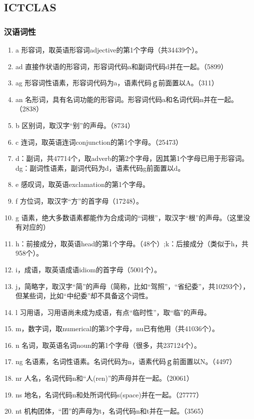 \subsection{ICTCLAS}
\subsubsection{汉语词性}
\begin{enumerate}[(1)]
\item a 形容词，取英语形容词adjective的第1个字母（共34439个）。
\item ad 直接作状语的形容词，形容词代码a和副词代码d并在一起。（5899）
\item ag 形容词性语素，形容词代码为a，语素代码ｇ前面置以A。（311）
\item an 名形词，具有名词功能的形容词。形容词代码a和名词代码n并在一起。（2838）
\item b 区别词，取汉字“别”的声母。（8734）
\item c 连词，取英语连词conjunction的第1个字母。（25473）
\item d：副词，共47714个，取adverb的第2个字母，因其第1个字母已用于形容词。dg：副词性语素，副词代码为d，语素代码g前面置以d。
\item e 感叹词，取英语exclamation的第1个字母。
\item f 方位词，取汉字“方”的首字母（17248）。
\item g 语素，绝大多数语素都能作为合成词的“词根”，取汉字“根”的声母。（这里没有对应的）
\item h：前接成分，取英语head的第1个字母。（48个）;k：后接成分（类似于h，共958个）。
\item i，成语，取英语成语idiom的首字母（5001个）。
\item j，简略字，取汉字“简”的声母（简称，比如“驾照”，“省纪委”，共10293个），但某些词，比如“中纪委”却不具备这个词性。
\item l 习用语，习用语尚未成为成语，有点“临时性”，取“临”的声母。
\item m，数字词，取numerical的第3个字母，nu已有他用（共41036个）。
\item n 名词，取英语名词noun的第1个字母（很多，共237124个）。
\item ng 名语素，名词性语素。名词代码为n，语素代码ｇ前面置以N。（4497）
\item nr 人名，名词代码n和“人(ren)”的声母并在一起。（20061）
\item ns 地名，名词代码n和处所词代码s(space)并在一起。（27777）
\item nt 机构团体，“团”的声母为t，名词代码n和t并在一起。（3565）

\end{enumerate}
